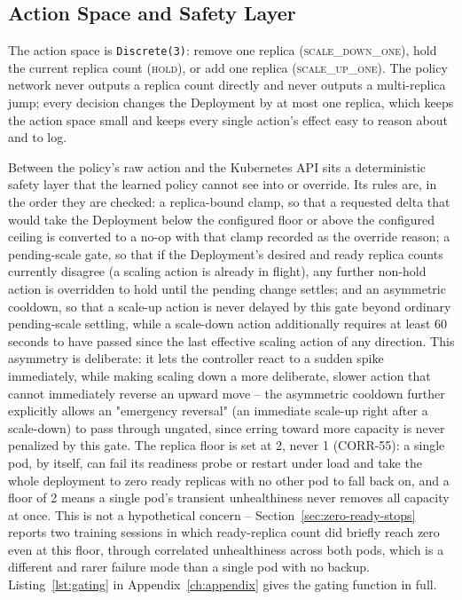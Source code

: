 \subsection{Action Space and Safety Layer}
\label{sec:safety-layer}

The action space is \texttt{Discrete(3)}: remove one replica
(\textsc{scale\_down\_one}), hold the current replica count
(\textsc{hold}), or add one replica (\textsc{scale\_up\_one}). The policy
network never outputs a replica count directly and never outputs a
multi-replica jump; every decision changes the Deployment by at most one
replica, which keeps the action space small and keeps every single action's
effect easy to reason about and to log.

Between the policy's raw action and the Kubernetes API sits a deterministic
safety layer that the learned policy cannot see into or override. Its rules
are, in the order they are checked: a replica-bound clamp, so that a
requested delta that would take the Deployment below the configured floor
or above the configured ceiling is converted to a no-op with that clamp
recorded as the override reason; a pending-scale gate, so that if the
Deployment's desired and ready replica counts currently disagree (a scaling
action is already in flight), any further non-hold action is overridden to
hold until the pending change settles; and an asymmetric cooldown, so that
a scale-up action is never delayed by this gate beyond ordinary pending-scale
settling, while a scale-down action additionally requires at least 60
seconds to have passed since the last effective scaling action of any
direction. This asymmetry is deliberate: it lets the controller react to a
sudden spike immediately, while making scaling down a more deliberate,
slower action that cannot immediately reverse an upward move -- the
asymmetric cooldown further explicitly allows an "emergency reversal" (an
immediate scale-up right after a scale-down) to pass through ungated, since
erring toward more capacity is never penalized by this gate. The replica
floor is set at 2, never 1 (CORR-55): a single pod, by itself, can fail its
readiness probe or restart under load and take the whole deployment to zero
ready replicas with no other pod to fall back on, and a floor of 2 means a
single pod's transient unhealthiness never removes all capacity at once.
This is not a hypothetical concern -- Section~\ref{sec:zero-ready-stops}
reports two training sessions in which ready-replica count did briefly
reach zero even at this floor, through correlated unhealthiness across both
pods, which is a different and rarer failure mode than a single pod with no
backup. Listing~\ref{lst:gating} in Appendix~\ref{ch:appendix} gives the
gating function in full.


